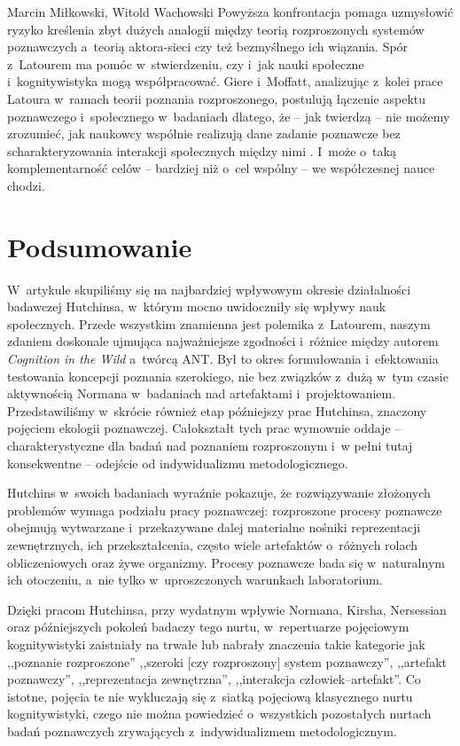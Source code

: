 \begin{artplenv2auth}{Marcin Miłkowski, Witold Wachowski}
Powyższa konfrontacja pomaga uzmysłowić ryzyko kreślenia zbyt dużych analogii między teorią rozproszonych systemów poznawczych a~teorią aktora-sieci czy też bezmyślnego ich wiązania. Spór z~Latourem ma pomóc w~stwierdzeniu, czy i~jak nauki społeczne i~kognitywistyka mogą współpracować. Giere i~Moffatt, analizując z~kolei prace Latoura w~ramach teorii poznania rozproszonego, postulują łączenie aspektu poznawczego i~społecznego w~badaniach dlatego, że -- jak twierdzą -- nie możemy zrozumieć, jak naukowcy wspólnie realizują dane zadanie poznawcze bez scharakteryzowania interakcji społecznych między nimi
\parencite[][s.~4–8]{giere_distributed_2003}. %
 I~może o~taką komplementarność celów -- bardziej niż o~cel wspólny -- we współczesnej nauce chodzi.

\section{Podsumowanie}

W~artykule skupiliśmy się na najbardziej wpływowym okresie działalności badawczej Hutchinsa, w~którym mocno uwidoczniły się wpływy nauk społecznych. Przede wszystkim znamienna jest polemika z~Latourem, naszym zdaniem doskonale ujmująca najważniejsze zgodności i~różnice między autorem \textit{Cognition in the Wild} a~twórcą ANT. Był to okres formułowania i~efektowania testowania koncepcji poznania szerokiego, nie bez związków z~dużą w~tym czasie aktywnością Normana w~badaniach nad artefaktami i~projektowaniem. Przedstawiliśmy w~skrócie również etap późniejszy prac Hutchinsa, znaczony pojęciem ekologii poznawczej. Całokształt tych prac wymownie oddaje -- charakterystyczne dla badań nad poznaniem rozproszonym i~w pełni tutaj konsekwentne -- odejście od indywidualizmu metodologicznego.

Hutchins w~swoich badaniach wyraźnie pokazuje, że rozwiązywanie złożonych problemów wymaga podziału pracy poznawczej: rozproszone procesy poznawcze obejmują wytwarzane i~przekazywane dalej materialne nośniki reprezentacji zewnętrznych, ich przekształcenia, często wiele artefaktów o~różnych rolach obliczeniowych oraz żywe organizmy. Procesy poznawcze bada się w~naturalnym ich otoczeniu, a~nie tylko w~uproszczonych warunkach laboratorium.

Dzięki pracom Hutchinsa, przy wydatnym wpływie Normana, Kirsha, Nersessian oraz późniejszych pokoleń badaczy tego nurtu, w~repertuarze pojęciowym kognitywistyki zaistniały na trwałe lub nabrały znaczenia takie kategorie jak ,,poznanie rozproszone'' ,,szeroki [czy rozproszony] system poznawczy'', ,,artefakt poznawczy'', ,,reprezentacja zewnętrzna'', ,,interakcja człowiek–artefakt''. Co istotne, pojęcia te nie wykluczają się z~siatką pojęciową klasycznego nurtu kognitywistyki, czego nie można powiedzieć o~wszystkich pozostałych nurtach badań poznawczych zrywających z~indywidualizmem metodologicznym.


\end{artplenv2auth}
